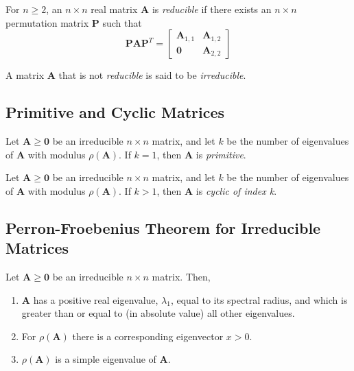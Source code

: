 \begin{definition}
For $n \ge 2$, an $n \times n$ real matrix $\mathbf{A}$ is \textit{reducible} if there exists an $n \times n$ permutation matrix $\mathbf{P}$ such that
	\begin{equation*}
		\mathbf{P}\mathbf{A}\mathbf{P}^{T} = 
		\begin{bmatrix} 
		\mathbf{A}_{1,1} & \mathbf{A}_{1,2} \\ 
		\mathbf{0} & \mathbf{A}_{2,2} 
		\end{bmatrix}
	\end{equation*}
\end{definition}

\begin{definition}
A matrix $\mathbf{A}$ that is not \textit{reducible} is said to be \textit{irreducible}.
\end{definition}

\subsection{Primitive and Cyclic Matrices}
			
\begin{definition}
Let $\mathbf{A} \ge \mathbf{0}$ be an irreducible $n \times n$ matrix, and let $k$ be the number of eigenvalues of $\mathbf{A}$ with modulus $\rho(\mathbf{A})$. If $k = 1$, then $\mathbf{A}$ is \textit{primitive}.
\end{definition}


\begin{definition}
Let $\mathbf{A} \ge \mathbf{0}$ be an irreducible $n \times n$ matrix, and let $k$ be the number of eigenvalues of $\mathbf{A}$ with modulus $\rho(\mathbf{A})$. If $k > 1$, then $\mathbf{A}$ is \textit{cyclic of index k}.
\end{definition}

\subsection{Perron-Froebenius Theorem for Irreducible Matrices}

\begin{theorem}
Let $\mathbf{A} \ge \mathbf{0}$ be an irreducible $n \times n$ matrix. Then,
	\begin{enumerate}
		\item $\mathbf{A}$ has a positive real eigenvalue, $\lambda_{1}$, equal to its spectral radius, and which is greater than or equal to (in absolute value) all other eigenvalues.
		\item For $\rho(\mathbf{A})$ there is a corresponding eigenvector $x > 0$.
		\item $\rho(\mathbf{A})$ is a simple eigenvalue of $\mathbf{A}$.
	\end{enumerate}
\end{theorem}

